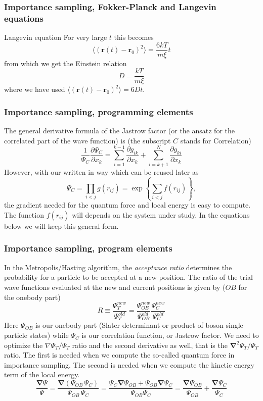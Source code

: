 \documentclass{beamer}
\begin{document}
\begin{frame}
\frametitle{Importance sampling, Fokker-Planck and Langevin equations}

\begin{block}{Langevin equation }
For very large $t$ this becomes
\[
\langle (\mathbf{r}(t)-\mathbf{r}_{0})^{2}\rangle =\frac{6kT}{m\xi }t 
\] 
from which we get the Einstein relation  
 \[ 
D= \frac{kT}{m\xi } 
\] 	
where we have used $\langle (\mathbf{r}(t)-\mathbf{r}_{0})^{2}\rangle =6Dt$.
\end{block}
\end{frame}

\begin{frame}
\frametitle{Importance sampling, programming elements}

The general derivative formula of the Jastrow factor (or the ansatz for the correlated part of the wave function) is (the subscript $C$ stands for Correlation)
\[
\frac{1}{\Psi_C}\frac{\partial \Psi_C}{\partial x_k} =
\sum_{i=1}^{k-1}\frac{\partial g_{ik}}{\partial x_k}
+
\sum_{i=k+1}^{N}\frac{\partial g_{ki}}{\partial x_k}
\]
However, 
with our written in way which can be reused later as
\[
\Psi_C=\prod_{i< j}g(r_{ij})= \exp{\left\{\sum_{i<j}f(r_{ij})\right\}},
\]
the gradient needed for the quantum force and local energy is easy to compute.  
The function $f(r_{ij})$ will depends on the system under study. In the equations below we will keep this general form.
\end{frame}

\begin{frame}
\frametitle{Importance sampling, program elements}

In the Metropolis/Hasting algorithm, the \emph{acceptance ratio} determines the probability for a particle  to be accepted at a new position. The ratio of the trial wave functions evaluated at the new and current positions is given by ($OB$ for the onebody  part)
\[
R \equiv \frac{\Psi_{T}^{new}}{\Psi_{T}^{old}} = 
\frac{\Psi_{OB}^{new}}{\Psi_{OB}^{old}}\frac{\Psi_{C}^{new}}{\Psi_{C}^{old}}
\]
Here $\Psi_{OB}$ is our onebody part (Slater determinant or product of boson single-particle states)  while $\Psi_{C}$ is our correlation function, or Jastrow factor. 
We need to optimize the $\nabla \Psi_T / \Psi_T$ ratio and the second derivative as well, that is
the $\mathbf{\nabla}^2 \Psi_T/\Psi_T$ ratio. The first is needed when we compute the so-called quantum force in importance sampling.
The second is needed when we compute the kinetic energy term of the local energy.
\[
\frac{\mathbf{\mathbf{\nabla}}  \Psi}{\Psi}  = \frac{\mathbf{\nabla}  (\Psi_{OB} \, \Psi_{C})}{\Psi_{OB} \, \Psi_{C}}  =  \frac{ \Psi_C \mathbf{\nabla}  \Psi_{OB} + \Psi_{OB} \mathbf{\nabla}  \Psi_{C}}{\Psi_{OB} \Psi_{C}} = \frac{\mathbf{\nabla}  \Psi_{OB}}{\Psi_{OB}} + \frac{\mathbf{\nabla}   \Psi_C}{ \Psi_C}
\]
\end{frame}
\end{document}
